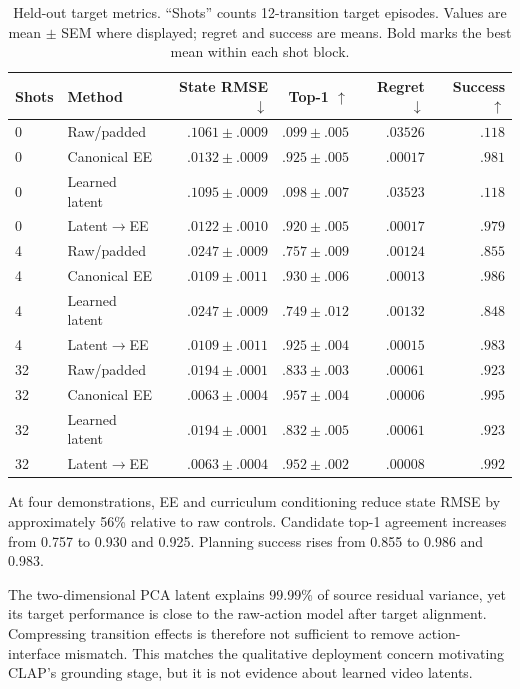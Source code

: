 \documentclass[11pt]{article}
\begin{document}
\begin{table}[H]
\centering
\small
\begin{tabular}{llrrrr}
\toprule
Shots & Method & State RMSE $\downarrow$ & Top-1 $\uparrow$ & Regret $\downarrow$ & Success $\uparrow$ \\
\midrule
0 & Raw/padded & $.1061\pm.0009$ & $.099\pm.005$ & $.03526$ & $.118$ \\
0 & Canonical EE & $.0132\pm.0009$ & $.925\pm.005$ & $.00017$ & $.981$ \\
0 & Learned latent & $.1095\pm.0009$ & $.098\pm.007$ & $.03523$ & $.118$ \\
0 & Latent$\rightarrow$EE & $\mathbf{.0122}\pm.0010$ & $.920\pm.005$ & $.00017$ & $.979$ \\
\midrule
4 & Raw/padded & $.0247\pm.0009$ & $.757\pm.009$ & $.00124$ & $.855$ \\
4 & Canonical EE & $\mathbf{.0109}\pm.0011$ & $\mathbf{.930}\pm.006$ & $\mathbf{.00013}$ & $\mathbf{.986}$ \\
4 & Learned latent & $.0247\pm.0009$ & $.749\pm.012$ & $.00132$ & $.848$ \\
4 & Latent$\rightarrow$EE & $.0109\pm.0011$ & $.925\pm.004$ & $.00015$ & $.983$ \\
\midrule
32 & Raw/padded & $.0194\pm.0001$ & $.833\pm.003$ & $.00061$ & $.923$ \\
32 & Canonical EE & $\mathbf{.0063}\pm.0004$ & $\mathbf{.957}\pm.004$ & $\mathbf{.00006}$ & $\mathbf{.995}$ \\
32 & Learned latent & $.0194\pm.0001$ & $.832\pm.005$ & $.00061$ & $.923$ \\
32 & Latent$\rightarrow$EE & $.0063\pm.0004$ & $.952\pm.002$ & $.00008$ & $.992$ \\
\bottomrule
\end{tabular}
\caption{Held-out target metrics. ``Shots'' counts 12-transition target episodes. Values are mean $\pm$ SEM where displayed; regret and success are means. Bold marks the best mean within each shot block.}
\label{tab:results}
\end{table}

At four demonstrations, EE and curriculum conditioning reduce state RMSE by approximately 56\% relative to raw controls. Candidate top-1 agreement increases from 0.757 to 0.930 and 0.925. Planning success rises from 0.855 to 0.986 and 0.983.

The two-dimensional PCA latent explains 99.99\% of source residual variance, yet its target performance is close to the raw-action model after target alignment. Compressing transition effects is therefore not sufficient to remove action-interface mismatch. This matches the qualitative deployment concern motivating CLAP's grounding stage, but it is not evidence about learned video latents.
\end{document}
